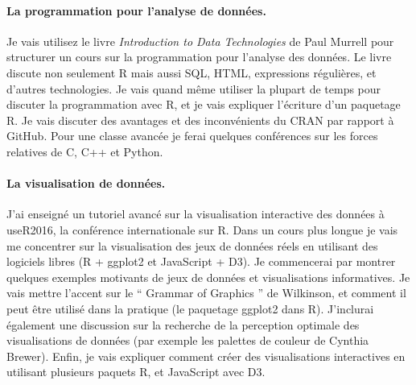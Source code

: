 \documentclass{article}
\begin{document}


\paragraph{La programmation pour l'analyse de données.} 
Je vais utilisez le livre \emph{Introduction to Data Technologies}
de Paul Murrell pour structurer un cours sur la programmation pour
l'analyse des données. Le livre discute non seulement R mais aussi
SQL, HTML, expressions régulières, et d'autres technologies. Je vais
quand même utiliser la plupart de temps pour discuter la programmation
avec R, et je vais expliquer l'écriture d'un paquetage R. Je vais
discuter des avantages et des inconvénients du CRAN par rapport à
GitHub. Pour une classe avancée je ferai quelques conférences sur les
forces relatives de C, C++ et Python.

\paragraph{La visualisation de données.} 
J'ai enseigné un tutoriel avancé sur la visualisation interactive des
données à useR2016, la conférence internationale sur R. Dans un cours
plus longue je vais me concentrer sur la visualisation des jeux de
données réels en utilisant des logiciels libres (R + ggplot2 et
JavaScript + D3). Je commencerai par montrer quelques exemples
motivants de jeux de données et visualisations informatives. Je vais
mettre l'accent sur le `` Grammar of Graphics '' de Wilkinson, et
comment il peut être utilisé dans la pratique (le paquetage ggplot2
dans R). J'inclurai également une discussion sur la recherche de la
perception optimale des visualisations de données (par exemple les
palettes de couleur de Cynthia Brewer). Enfin, je vais expliquer
comment créer des visualisations interactives en utilisant plusieurs
paquets R, et JavaScript avec D3.
\end{document}
